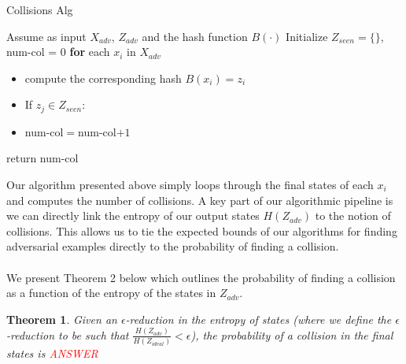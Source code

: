 \documentclass[letterpaper,twocolumn,10pt]{article}
\newtheorem{theorem}{Theorem}
\begin{document}
\begin{algorithm} \label{alg:col}
\caption{Collisions Alg}\label{sampling}
\begin{algorithmic}[1]
\State Assume as input $X_{adv}$, $Z_{adv}$ and the hash function $B(\cdot)$
\State Initialize $Z_{seen} = \{\}$, num-col = 0
\State \textbf{for} each $x_{i}$ in $X_{adv}$
\begin{itemize}
\item compute the corresponding hash $B(x_{i}) = z_{i}$
\item If $z_{j} \in Z_{seen}$:
\item  num-col$=$num-col$ + 1$
\end{itemize}
\item return num-col
\end{algorithmic}
\end{algorithm}

Our algorithm presented above simply loops through the final states of each $x_{i}$ and computes the number of collisions. A key part of our algorithmic pipeline is we can directly link the entropy of our output states $H(Z_{adv})$ to the notion of collisions. This allows us to tie the expected bounds of our algorithms for finding adversarial examples directly to the probability of finding a collision.  
\\
\\
We present Theorem 2 below which outlines the probability of finding a collision as a function of the entropy of the states in  $Z_{adv}$.

\begin{theorem}
Given an $\epsilon$-reduction in the entropy of states (where we define the $\epsilon$-reduction to be such that $\frac{H(Z_{adv})}{H(Z_{ideal})} < \epsilon$), the probability of a collision in the final states is \textcolor{red}{ANSWER}
\end{theorem}
\end{document}
